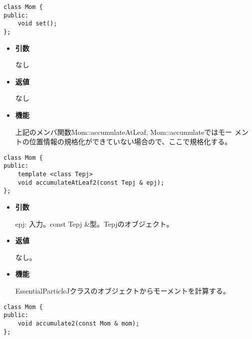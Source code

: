 
\begin{screen}
\begin{verbatim}
class Mom {
public:
    void set();
};
\end{verbatim}
\end{screen}

\begin{itemize}

\item {\bf 引数}

  なし
  
\item {\bf 返値}

  なし

\item {\bf 機能}

  上記のメンバ関数Mom::accumulateAtLeaf, Mom::accumulateではモー
  メントの位置情報の規格化ができていない場合ので、ここで規格化する。
  
\end{itemize}


\begin{screen}
\begin{verbatim}
class Mom {
public:
    template <class Tepj>
    void accumulateAtLeaf2(const Tepj & epj);
};
\end{verbatim}
\end{screen}

\begin{itemize}

\item {\bf 引数}

  epj: 入力。const Tepj \&型。Tepjのオブジェクト。
  
\item {\bf 返値}

  なし。

\item {\bf 機能}

  EssentialParticleJクラスのオブジェクトからモーメントを計算する。
  
\end{itemize}


\begin{screen}
\begin{verbatim}
class Mom {
public:
    void accumulate2(const Mom & mom);
};
\end{verbatim}
\end{screen}


